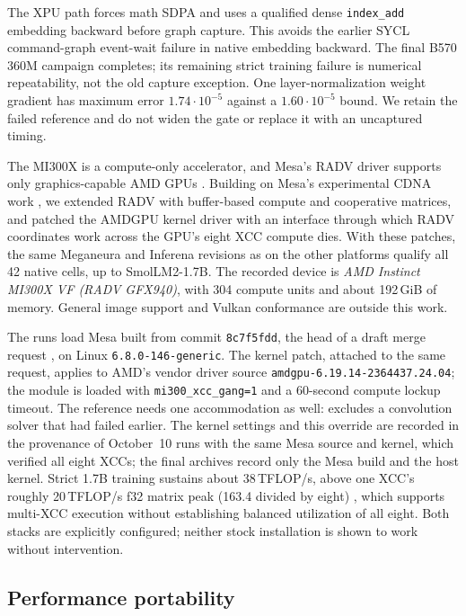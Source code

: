 \documentclass[conference]{IEEEtran}
\newcommand{\system}{Meganeura}
\newcommand{\inferena}{Inferena}
\newcommand{\code}[1]{\texttt{#1}}
\begin{document}
The XPU path forces math SDPA and uses a qualified dense \code{index\_add}
embedding backward before graph capture. This avoids the earlier SYCL
command-graph event-wait failure in native embedding backward. The final
B570 360M campaign completes; its remaining strict training failure is
numerical repeatability, not the old capture exception. One layer-normalization
weight gradient has maximum error $1.74\cdot10^{-5}$ against a
$1.60\cdot10^{-5}$ bound. We retain the failed reference and do not widen the
gate or replace it with an uncaptured timing.

The MI300X is a compute-only accelerator, and Mesa's RADV driver supports
only graphics-capable AMD GPUs \cite{mesa2026radv}. Building on Mesa's
experimental CDNA work \cite{mesa2025cdna}, we extended RADV with
buffer-based compute and cooperative matrices, and patched the AMDGPU kernel
driver with an interface through which RADV coordinates work across the
GPU's eight XCC compute dies. With these patches, the same \system{} and
\inferena{} revisions as on the other platforms qualify all 42 native cells,
up to SmolLM2-1.7B. The recorded device is \emph{AMD Instinct MI300X VF (RADV
GFX940)}, with 304 compute units and about 192\,GiB of memory. General image
support and Vulkan conformance are outside this work.

The runs load Mesa built from commit \code{8c7f5fdd}, the head of a draft
merge request \cite{malyshau2026mi300}, on Linux \code{6.8.0-146-generic}.
The kernel patch, attached to the same request, applies to AMD's vendor
driver source \code{amdgpu-6.19.14-2364437.24.04}; the module is loaded with
\code{mi300\_xcc\_gang=1} and a 60-second compute lockup timeout. The
reference needs one accommodation as well:
 excludes a
convolution solver that had failed earlier. The kernel settings and this
override are recorded in the provenance of October~10 runs with the same Mesa
source and kernel, which verified all eight XCCs; the final archives record
only the Mesa build and the host kernel. Strict 1.7B training sustains about
38\,TFLOP/s, above one XCC's roughly 20\,TFLOP/s f32 matrix peak
(163.4 divided by eight) \cite{amd2026mi300xspec}, which supports
multi-XCC execution without establishing balanced utilization of all eight.
Both stacks are explicitly configured; neither stock installation is shown
to work without intervention.

\subsection{Performance portability}
\end{document}
